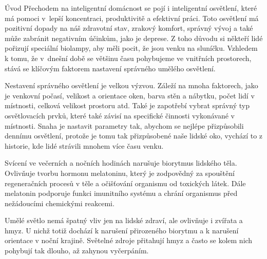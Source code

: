 \chap Úvod
Přechodem na inteligentní domácnost se pojí i inteligentní osvětlení, které má pomoci v~lepší koncentraci, produktivitě a efektivní práci. Toto osvětlení má pozitivní dopady
na náš zdravotní stav, zrakový komfort, správný vývoj a také může zabránit negativním
účinkům, jako je deprese. Z toho důvodu si někteří lidé pořizují speciální biolampy, aby
měli pocit, že jsou venku na sluníčku. Vzhledem k tomu, že v~dnešní době se většinu času
pohybujeme ve vnitřních prostorech, stává se klíčovým faktorem nastavení správného
umělého osvětlení.

\medskip
Nestavení správného osvětlení je velkou výzvou. Záleží na mnoha faktorech, jako je venkovní počasí, velikost a orientace oken,
barva stěn a nábytku, počet lidí v místnosti, celková velikost prostoru atd. Také je zapotřebí vybrat správný typ osvětlovacích prvků,
které také závisí na specifické činnosti vykonávané v místnosti. Snaha je nastavit parametry tak, abychom se nejlépe přizpůsobili
dennímu osvětlení, protože je tomu tak přizpůsobené naše lidské oko, vychází to z historie, kde lidé strávili mnohem více času venku.

\medskip
Svícení ve večerních a nočních hodinách narušuje biorytmus lidského těla. Ovlivňuje tvorbu hormonu melatoninu, který je
zodpovědný za spouštění regeneračních procesů v těle a očišťování organismu od toxických látek. Dále melatonin podporuje
funkci imunitního systému a chrání organismus před nežádoucími chemickými reakcemi.

\medskip
Umělé světlo nemá špatný vliv jen na lidské zdraví, ale ovlivňuje i zvířata a hmyz. U nichž totiž dochází k narušení
přirozeného biorytmu a k narušení orientace v noční krajině. Světelné zdroje přitahují hmyz a často se kolem nich
pohybují tak dlouho, až zahynou vyčerpáním.


